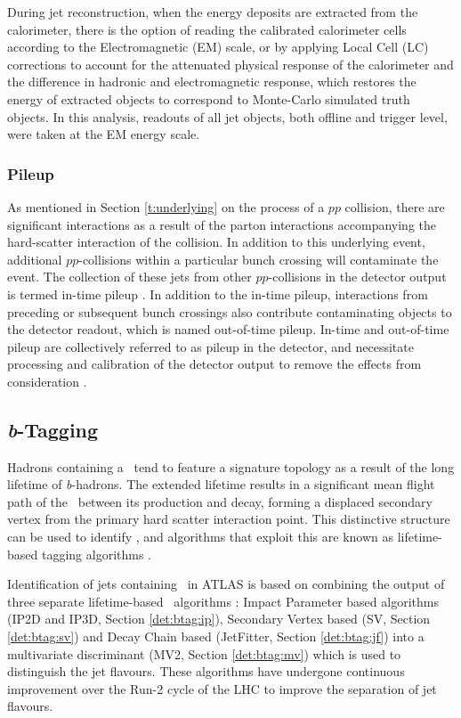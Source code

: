 	During jet reconstruction, when the energy deposits are extracted from the calorimeter, there is the option of reading the calibrated \cite{tilecalib} calorimeter cells according to the Electromagnetic (EM) scale, or by applying Local Cell (LC) corrections \cite{localcell} to account for the attenuated physical response of the calorimeter and the difference in hadronic and electromagnetic response, which restores the energy of extracted objects to correspond to Monte-Carlo simulated truth objects. In this analysis, readouts of all jet objects, both offline and trigger level, were taken at the EM energy scale.

	\subsubsection{Pileup}

	As mentioned in Section \ref{t:underlying} on the process of a $pp$ collision, there are significant interactions as a result of the parton interactions accompanying the hard-scatter interaction of the collision. In addition to this underlying event, additional $pp$-collisions within a particular bunch crossing will contaminate the event. The collection of these jets from other $pp$-collisions in the detector output is termed in-time pileup \cite{simpileup}. In addition to the in-time pileup, interactions from preceding or subsequent bunch crossings also contribute contaminating objects to the detector readout, which is named out-of-time pileup. In-time and out-of-time pileup are collectively referred to as pileup in the detector, and necessitate processing and calibration of the detector output to remove the effects from consideration \cite{pileup}.

\subsection{\textit{b}-Tagging}
\label{det:btagging}

	Hadrons containing a \bquark\, tend to feature a signature topology as a result of the long lifetime of \textit{b}-hadrons. The extended lifetime results in a significant mean flight path of the \bhadron\ between its production and decay, forming a displaced secondary vertex from the primary hard scatter interaction point. This distinctive structure can be used to identify \bjets, and algorithms that exploit this are known as lifetime-based tagging algorithms \cite{bTagPerformance}.

	Identification of jets containing \bhadrons\, in ATLAS is based on combining the output of three separate lifetime-based \btag\, algorithms \cite{bTagExpPerf}: Impact Parameter based algorithms (IP2D and IP3D, Section \ref{det:btag:ip}), Secondary Vertex based (SV, Section \ref{det:btag:sv}) and Decay Chain based (JetFitter, Section \ref{det:btag:jf}) into a multivariate discriminant (MV2, Section \ref{det:btag:mv}) which is used to distinguish the jet flavours. These algorithms have undergone continuous improvement over the Run-2 cycle of the LHC to improve the separation of jet flavours.

